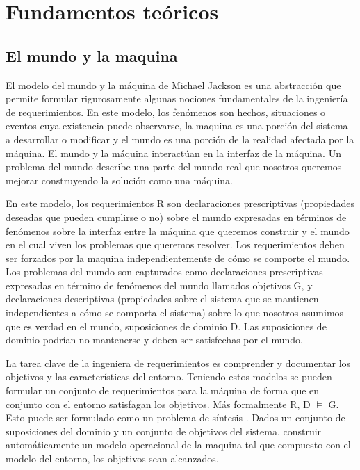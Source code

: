 \chapter{Fundamentos teóricos}

\section{El mundo y la maquina}
El modelo del mundo y la máquina de Michael Jackson \cite{MundoMaquina} es una abstracción que permite formular rigurosamente algunas nociones
fundamentales de la ingeniería de requerimientos. En este modelo, los fenómenos son hechos, situaciones o eventos cuya
existencia puede observarse, la maquina es una porción del sistema a desarrollar o modificar y el mundo es una porción de
la realidad afectada por la máquina. El mundo y la máquina interactúan en la interfaz de la máquina. Un problema del mundo 
describe una parte del mundo real que nosotros queremos mejorar construyendo la solución como una máquina.

\vspace{\baselineskip} 
En este modelo, los requerimientos R son declaraciones prescriptivas (propiedades deseadas que pueden cumplirse o no) sobre 
el mundo expresadas en términos de fenómenos sobre la interfaz entre la máquina que queremos construir y el mundo en el cual 
viven los problemas que queremos resolver. Los requerimientos deben ser forzados por la maquina independientemente de cómo 
se comporte el mundo. Los problemas del mundo son capturados como declaraciones prescriptivas expresadas en término de 
fenómenos del mundo llamados objetivos G, y declaraciones descriptivas (propiedades sobre el sistema que se mantienen 
independientes a cómo se comporta el sistema) sobre lo que nosotros asumimos que es verdad en el mundo, suposiciones 
de dominio D. Las suposiciones de dominio podrían no mantenerse y deben ser satisfechas por el mundo. 

\vspace{\baselineskip}
La tarea clave de la ingeniera de requerimientos es comprender y documentar los objetivos y las características del entorno.
Teniendo estos modelos se pueden formular un conjunto de requerimientos para la máquina de forma que en conjunto con el
entorno satisfagan los objetivos. Más formalmente R, D $\vDash$ G.
Esto puede ser formulado como un problema de síntesis \cite{Sintesis}. Dados un conjunto de suposiciones del dominio y un conjunto de
objetivos del sistema, construir  automáticamente un modelo operacional de la maquina tal que compuesto con el modelo del
entorno, los objetivos sean alcanzados.

